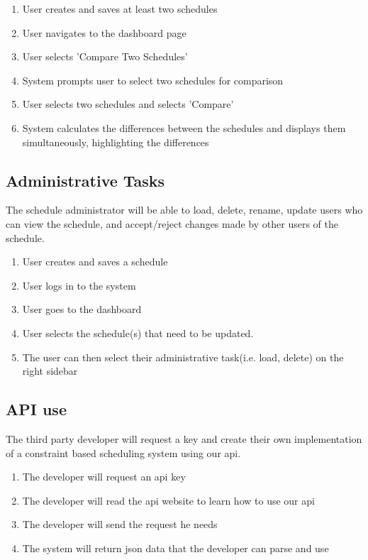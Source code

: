 \documentclass{extarticle}
\begin{document}
\begin{enumerate}
\item User creates and saves at least two schedules
\item User navigates to the dashboard page
\item User selects 'Compare Two Schedules'
\item System prompts user to select two schedules for comparison
\item User selects two schedules and selects 'Compare'
\item System calculates the differences between the schedules and displays them simultaneously, highlighting the
differences
\end{enumerate}

  
\subsection{Administrative Tasks}
The schedule administrator will be able to load, delete, rename, update users who can view the schedule, and accept/reject 
changes made by other users of the schedule.
\begin{enumerate}
\item User creates and saves a schedule
\item User logs in to the system
\item User goes to the dashboard
\item User selects the schedule(s) that need to be updated.
\item The user can then select their administrative task(i.e. load, delete) on the right sidebar
\end{enumerate}


\subsection{API use}
The third party developer will request a key and create their own implementation of a constraint based scheduling 
system using our api.

\begin{enumerate}
\item The developer will request an api key
\item The developer will read the api website to learn how to use our api
\item The developer will send the request he needs
\item The system will return json data that the developer can parse and use
\end{enumerate}
\end{document}

